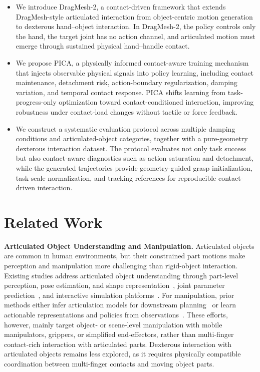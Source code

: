 \documentclass{article}
\begin{document}
\begin{itemize}[leftmargin=1.2em]

\item We introduce DragMesh-2, a contact-driven framework that extends DragMesh-style articulated interaction from object-centric motion generation to dexterous hand--object interaction. In DragMesh-2, the policy controls only the hand, the target joint has no action channel, and articulated motion must emerge through sustained physical hand--handle contact.

\item  We propose PICA, a physically informed contact-aware training mechanism that injects observable physical signals into policy learning, including contact maintenance, detachment risk, action-boundary regularization, damping variation, and temporal contact response. PICA shifts learning from task-progress-only optimization toward contact-conditioned interaction, improving robustness under contact-load changes without tactile or force feedback.

\item We construct a systematic evaluation protocol across multiple damping conditions and articulated-object categories, together with a pure-geometry dexterous interaction dataset. The protocol evaluates not only task success but also contact-aware diagnostics such as action saturation and detachment, while the generated trajectories provide geometry-guided grasp initialization, task-scale normalization, and tracking references for reproducible contact-driven interaction.
    
\end{itemize}


\section{Related Work}

\textbf{Articulated Object Understanding and Manipulation.}
Articulated objects are common in human environments, but their constrained part motions make perception and manipulation more challenging than rigid-object interaction. Existing studies address articulated object understanding through part-level perception, pose estimation, and shape representation~\cite{geng2023gapartnet,li2020category,mu2021sdf,zhang2026dicart}, joint parameter prediction~\cite{wang2019shape2motion,jain2021screwnet,jiang2022ditto}, and interactive simulation platforms~\cite{makoviychuk2021isaac,xiang2020sapien}. For manipulation, prior methods either infer articulation models for downstream planning~\cite{buchanan2026online} or learn actionable representations and policies from observations~\cite{mo2021where2act,xu2022umpnet,eisner2022flowbot3d}. These efforts, however, mainly target object- or scene-level manipulation with mobile manipulators, grippers, or simplified end-effectors, rather than multi-finger contact-rich interaction with articulated parts. Dexterous interaction with articulated objects remains less explored, as it requires physically compatible coordination between multi-finger contacts and moving object parts.
\end{document}
